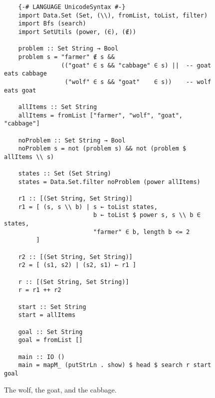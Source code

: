 \begin{figure}[!ht]
\centering
\begin{verbatim}
    {-# LANGUAGE UnicodeSyntax #-}
    import Data.Set (Set, (\\), fromList, toList, filter)
    import Bfs (search)
    import SetUtils (power, (∈), (∉))
      
    problem :: Set String → Bool
    problem s = "farmer" ∉ s &&
                (("goat" ∈ s && "cabbage" ∈ s) ||  -- goat eats cabbage
                 ("wolf" ∈ s && "goat"    ∈ s))    -- wolf eats goat
    
    allItems :: Set String
    allItems = fromList ["farmer", "wolf", "goat", "cabbage"]
    
    noProblem :: Set String → Bool
    noProblem s = not (problem s) && not (problem $ allItems \\ s)
    
    states :: Set (Set String)
    states = Data.Set.filter noProblem (power allItems)
    
    r1 :: [(Set String, Set String)]
    r1 = [ (s, s \\ b) | s ← toList states,
                         b ← toList $ power s, s \\ b ∈ states,
                         "farmer" ∈ b, length b <= 2
         ]
    
    r2 :: [(Set String, Set String)]
    r2 = [ (s1, s2) | (s2, s1) ← r1 ]
    
    r :: [(Set String, Set String)]
    r = r1 ++ r2
    
    start :: Set String
    start = allItems
    
    goal :: Set String
    goal = fromList []
    
    main :: IO ()
    main = mapM_ (putStrLn . show) $ head $ search r start goal 
\end{verbatim}
\vspace*{-0.3cm}
\caption{The wolf, the goat, and the cabbage.}
\label{fig:wolf-goat-cabbage.hs}
\end{figure}

